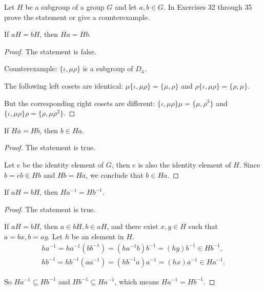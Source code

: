 Let $H$ be a subgroup of a group $G$ and let $a, b\in G$. In Exercises 32 through 35 prove the statement or give a counterexample.

\newpage
\begin{exercise}
    If $aH = bH$, then $Ha = Hb$.
\end{exercise}

\begin{proof}
    The statement is false.

    Counterexample: $\{ \iota, \mu\rho \}$ is a subgroup of $D_{4}$.

    The following left cosets are identical: $\mu\{ \iota, \mu\rho \} = \{ \mu, \rho \}$ and $\rho \{ \iota, \mu\rho \} = \{ \rho, \mu \}$.

    But the corresponding right cosets are different: $\{ \iota, \mu\rho \}\mu = \{ \mu, \rho^{3} \}$ and $\{ \iota, \mu\rho \}\rho = \{ \rho, \mu\rho^{2} \}$.
\end{proof}

\newpage
\begin{exercise}
    If $Ha = Hb$, then $b\in Ha$.
\end{exercise}

\begin{proof}
    The statement is true.

    Let $e$ be the identity element of $G$, then $e$ is also the identity element of $H$. Since $b = eb\in Hb$ and $Hb = Ha$, we conclude that $b\in Ha$.
\end{proof}

\newpage
\begin{exercise}
    If $aH = bH$, then $Ha^{-1} = Hb^{-1}$.
\end{exercise}

\begin{proof}
    The statement is true.

    If $aH = bH$, then $a\in bH, b\in aH$, and there exist $x, y\in H$ such that $a = bx, b = ay$. Let $h$ be an element in $H$.
    \[
        \begin{split}
            ha^{-1} = ha^{-1}(bb^{-1}) = (ha^{-1}b)b^{-1} = (hy)b^{-1} \in Hb^{-1}, \\
            hb^{-1} = hb^{-1}(aa^{-1}) = (hb^{-1}a)a^{-1} = (hx)a^{-1} \in Ha^{-1}.
        \end{split}
    \]

    So $Ha^{-1} \subseteq Hb^{-1}$ and $Hb^{-1} \subseteq Ha^{-1}$, which means $Ha^{-1} = Hb^{-1}$.
\end{proof}

